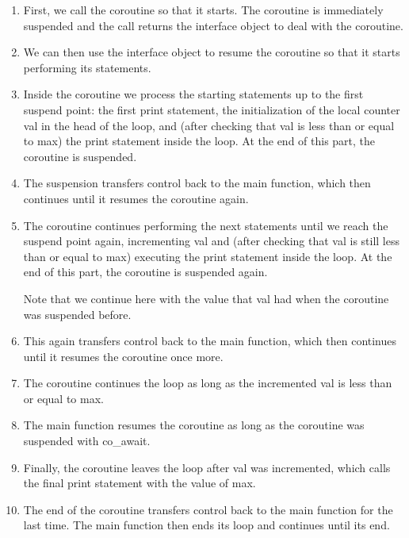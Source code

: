 \begin{enumerate}[label=\alph*)]
\item 
First, we call the coroutine so that it starts. The coroutine is immediately suspended and the call returns the interface object to deal with the coroutine.

\item 
We can then use the interface object to resume the coroutine so that it starts performing its statements.

\item 
Inside the coroutine we process the starting statements up to the first suspend point: the first print statement, the initialization of the local counter val in the head of the loop, and (after checking that val is less than or equal to max) the print statement inside the loop. At the end of this part, the coroutine is suspended.

\item 
The suspension transfers control back to the main function, which then continues until it resumes the coroutine again.

\item 
The coroutine continues performing the next statements until we reach the suspend point again, incrementing val and (after checking that val is still less than or equal to max) executing the print statement inside the loop. At the end of this part, the coroutine is suspended again.

Note that we continue here with the value that val had when the coroutine was suspended before.

\item 
This again transfers control back to the main function, which then continues until it resumes the coroutine once more.

\item 
The coroutine continues the loop as long as the incremented val is less than or equal to max.

\item 
The main function resumes the coroutine as long as the coroutine was suspended with co\_await.

\item 
Finally, the coroutine leaves the loop after val was incremented, which calls the final print statement with the value of max.

\item 
The end of the coroutine transfers control back to the main function for the last time. The main function then ends its loop and continues until its end.
\end{enumerate}

